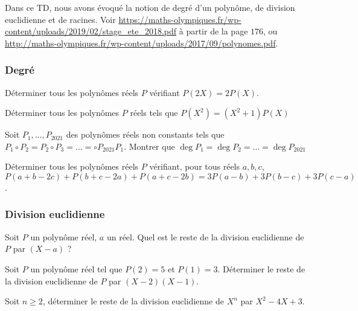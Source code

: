 Dans ce TD, nous avons évoqué la notion de degré d'un polynôme, de division euclidienne et de racines. Voir \url{https://maths-olympiques.fr/wp-content/uploads/2019/02/stage_ete_2018.pdf} à partir de la page $176$, ou \url{http://maths-olympiques.fr/wp-content/uploads/2017/09/polynomes.pdf}.


\subsubsection{Degré}


\begin{exo}
Déterminer tous les polynômes réels $P$ vérifiant $P(2X) = 2P(X)$.
\end{exo}


\begin{exo}
Déterminer tous les polynômes $P$ réels tels que $P(X^2) = (X^2 + 1)P(X)$
\end{exo}


\begin{exo}
Soit $P_1,\dots, P_{2021}$ des polynômes réels non constants tels que $P_1\circ P_2 = P_2\circ P_3 = \dots = \circ P_{2021}P_1$. Montrer que $\deg P_1 = \deg P_2 = \dots = \deg P_{2021}$
\end{exo}


\begin{exo}
Déterminer tous les polynômes réels $P$ vérifiant, pour tous réels $a, b, c$, $P(a + b-2c) + P(b + c - 2a) + P(a + c - 2b) = 3P(a - b) + 3P(b - c) + 3P(c - a)$.
\end{exo}


\subsubsection{Division euclidienne}


\begin{exo}
Soit $P$ un polynôme réel, $a$ un réel. Quel est le reste de la division euclidienne de $P$ par $(X - a)$ ?
\end{exo}


\begin{exo}
Soit $P$ un polynôme réel tel que $P(2) = 5$ et $P(1) = 3$. Déterminer le reste de la division euclidienne de $P$ par $(X - 2)(X - 1)$.
\end{exo}


\begin{exo}
Soit $n\ge 2$, déterminer le reste de la division euclidienne de $X^n$ par $X^2 - 4X + 3$.
\end{exo}


